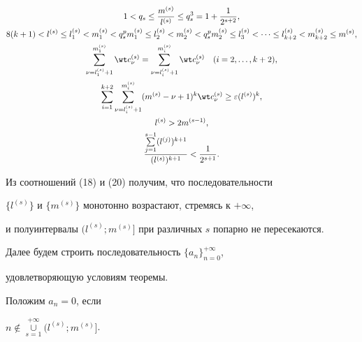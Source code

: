 \begin{gather}


1<q_s \le \frac{m^{(s)}}{l^{(s)}} \le q_s^3=1+\frac{1}{2^{s+2}},\\


%


8(k+1)<l^{(s)}\le l_1^{(s)}<m_1^{(s)}<


q_s^p m_1^{(s)}\le l_2^{(s)}<m_2^{(s)}<q_s^p m_2^{(s)} \le 


%


l_3^{(s)}< \dotsb 


\le l_{k+2}^{(s)}<m_{k+2}^{(s)} \le m^{(s)},\\


%


\sum_{\nu=l_1^{(s)}+1}^{m_1^{(s)}} \wt c{}_{\nu}^{(s)}=


\sum_{\nu=l_i^{(s)}+1}^{m_i^{(s)}} \wt c{}_{\nu}^{(s)}\quad (i=2,\dotsc,k+2),\\


%


\sum_{i=1}^{k+2} \sum_{\nu=l_i^{(s)}+1}^{m_i^{(s)}} (m^{(s)}-\nu+1)^k 


\wt c{}_{\nu}^{(s)} \ge \varepsilon (l^{(s)})^k,\\


%


l^{(s)}>2 m^{(s-1)},\\


%


\frac{\sum\limits_{j=1}^{s-1} (l^{(j)})^{k+1}}{(l^{(s)})^{k+1}}


<\frac{1}{2^{s+1}}.


\end{gather}





Из соотношений (18) и (20) получим, что последовательности 


$\{l^{(s)}\}$ и $\{m^{(s)}\}$ монотонно возрастают, стремясь к $+\infty$,


и полуинтервалы $(l^{(s)}; m^{(s)}]$ при различных $s$ попарно не пересекаются.





Далее будем строить последовательность $\{a_n \}_{n=0}^{+\infty}$,


удовлетворяющую условиям теоремы. 





Положим $a_n=0$, если


$n \notin \mathop{\cup}\limits_{s=1}^{+\infty}(l^{(s)};m^{(s)}]$.


